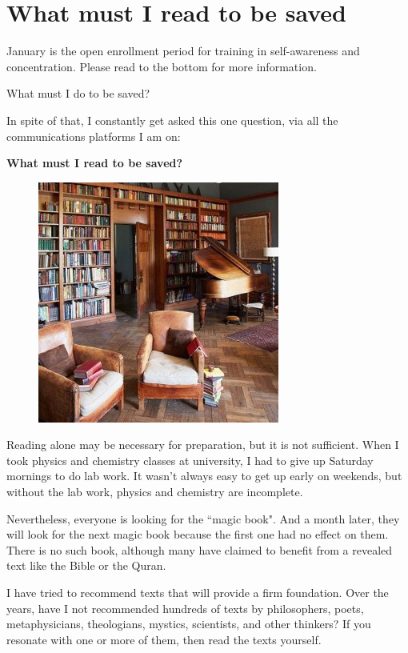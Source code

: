 \section{What must I read to be saved}

January is the open enrollment period for training in self-awareness and concentration. Please read to the bottom for more information. 

\begin{quotex}
What must I do to be saved? 

\end{quotex}
In spite of that, I constantly get asked this one question, via all the communications platforms I am on:

\textbf{What must I read to be saved?}

\begin{figure}
 \includegraphics[scale=.4]{a20220102WhatmustIreadtobesaved-img001.jpg} 
\end{figure}

Reading alone may be necessary for preparation, but it is not sufficient. When I took physics and chemistry classes at university, I had to give up Saturday mornings to do lab work. It wasn't always easy to get up early on weekends, but without the lab work, physics and chemistry are incomplete.

Nevertheless, everyone is looking for the ``magic book". And a month later, they will look for the next magic book because the first one had no effect on them. There is no such book, although many have claimed to benefit from a revealed text like the Bible or the Quran.

I have tried to recommend texts that will provide a firm foundation. Over the years, have I not recommended hundreds of texts by philosophers, poets, metaphysicians, theologians, mystics, scientists, and other thinkers? If you resonate with one or more of them, then read the texts yourself.

